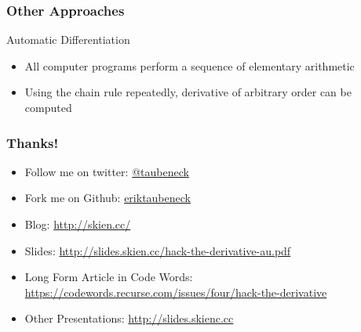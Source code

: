 \documentclass{beamer}
\begin{document}
\begin{frame}
\frametitle{Other Approaches}

    Automatic Differentiation

    \begin{itemize}
      \item All computer programs perform a sequence of elementary arithmetic
      \item Using the chain rule repeatedly, derivative of arbitrary order can be computed
    \end{itemize}

\end{frame}


\begin{frame}

\frametitle{Thanks!}

\begin{itemize}
  \item Follow me on twitter: \href{https://twitter.com/taubeneck}{@taubeneck}
  \item Fork me on Github: \href{https://github.com/eriktaubeneck}{eriktaubeneck}
  \item Blog: \url{http://skien.cc/}
  \item Slides: \url{http://slides.skien.cc/hack-the-derivative-au.pdf}
  \item Long Form Article in Code Words: \url{https://codewords.recurse.com/issues/four/hack-the-derivative}
  \item Other Presentations: \url{http://slides.skienc.cc}
\end{itemize}

\end{frame}
\end{document}
